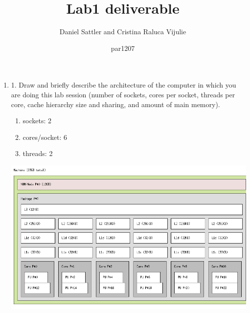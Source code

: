 \documentclass[12pt]{article}
\begin{document}
 
 
\title{Lab1 deliverable}%
\author{Daniel Sattler and Cristina Raluca Vijulie\and par1207} %
 
\maketitle  
\begin{enumerate}
\section*{Node architecture and memory}

\item[] 1. Draw and briefly describe the architecture of the computer in which you are doing this lab session (number of sockets, cores per socket, threads per core, cache hierarchy size and sharing, and amount of main memory).

\begin{enumerate}
\item sockets: 2
\item cores/socket: 6
\item threads: 2
\end{enumerate}

\begin{center}
\includegraphics[width=14cm]{fig1.png}
\end{center}


\end{enumerate}
\end{document}
